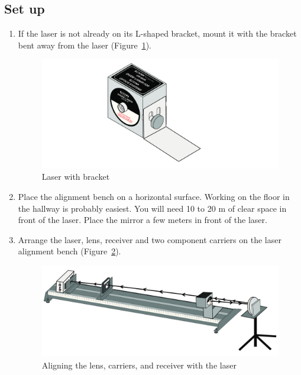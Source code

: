 \documentclass{article}
\begin{document}
\subsection{Set up}

\begin{enumerate}
\item If the laser is not already on its L-shaped bracket, mount it with the
bracket bent away from the laser (Figure~\ref{fig:laser}).
\begin{figure}[h]
\includegraphics{images/diode-laser.jpg}
\caption{\label{fig:laser} Laser with bracket}
\end{figure}

\item Place the alignment bench on a horizontal surface. Working on the floor in the hallway is probably easiest.  You will need 
10 to 20 m of clear space in front of the laser.  Place the mirror a few meters in front of the laser.


\item Arrange the laser, lens, receiver and two component carriers on the
laser alignment bench (Figure~\ref{fig:align}).
\begin{figure}[h]
\includegraphics{images/aligning.jpg}
\caption{\label{fig:align} Aligning the lens, carriers, and receiver with the laser }
\end{figure}


\end{enumerate}
\end{document}
